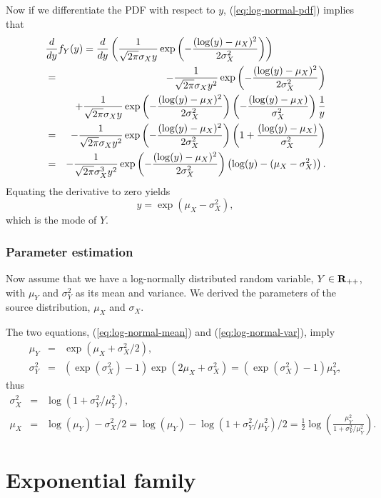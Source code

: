 Now if we differentiate the PDF with respect to $y$,
(\ref{eq:log-normal-pdf}) implies that
\begin{eqnarray*}
\lefteqn{
\frac{d}{dy} f_Y(y)
= \frac{d}{dy} \left(\frac{1}{\sqrt{2\pi} \sigma_X y}  \exp\left(-\frac{(\log(y)-\mu_X)^2}{2\sigma_X^2}\right)\right)
}
\\
&=&
-\frac{1}{\sqrt{2\pi} \sigma_X y^2}  \exp\left(-\frac{(\log(y)-\mu_X)^2}{2\sigma_X^2}\right)
\\
&&
+
\frac{1}{\sqrt{2\pi} \sigma_X y}  \exp\left(-\frac{(\log(y)-\mu_X)^2}{2\sigma_X^2}\right)
\left(-\frac{(\log(y)-\mu_X)}{\sigma_X^2}\right)
\frac{1}{y}
\\
&=&
-\frac{1}{\sqrt{2\pi} \sigma_X y^2}  \exp\left(-\frac{(\log(y)-\mu_X)^2}{2\sigma_X^2}\right)
\left(1+\frac{(\log(y)-\mu_X)}{\sigma_X^2} \right)
\\
&=&
-\frac{1}{\sqrt{2\pi} \sigma_X^3 y^2}  \exp\left(-\frac{(\log(y)-\mu_X)^2}{2\sigma_X^2}\right)
\left(\log(y)-(\mu_X-\sigma_X^2) \right).
\end{eqnarray*}
Equating the derivative to zero yields
\begin{equation}
y = \exp(\mu_X-\sigma_X^2),
\end{equation}
which is the mode of $Y$.


\subsubsection{Parameter estimation}

Now assume that we have a log-normally distributed random variable, $Y\in{\mathbf{R}_{++}}$,
with $\mu_Y$ and $\sigma_Y^2$ as its mean and variance.
We derived the parameters of the source distribution, $\mu_X$ and $\sigma_X$.

The two equations, (\ref{eq:log-normal-mean}) and (\ref{eq:log-normal-var}), imply
\begin{eqnarray*}
\mu_Y &=& \exp(\mu_X+\sigma_X^2/2),
\\
\sigma_Y^2 &=& (\exp(\sigma_X^2)-1)\exp(2\mu_X+\sigma_X^2) = (\exp(\sigma_X^2)-1) \mu_Y^2,
\end{eqnarray*}
thus
\begin{eqnarray*}
\sigma_X^2 &=& \log(1+{\sigma_Y^2}/{\mu_Y^2}),
\\
\mu_X &=& \log(\mu_Y) - \sigma_X^2/2 = \log(\mu_Y) - \log(1+{\sigma_Y^2}/{\mu_Y^2})/2
= \frac{1}{2} \log\left(\frac{\mu_Y^2}{1+{\sigma_Y^2}/{\mu_Y^2}}\right).
\end{eqnarray*}


\section{Exponential family}

